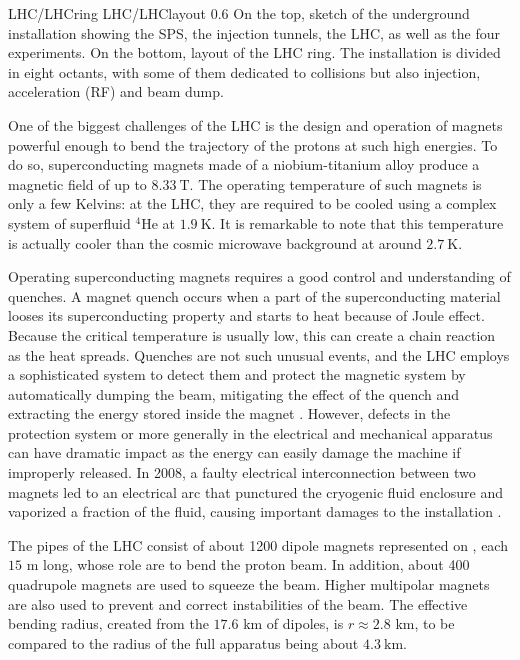                      {LHC/LHCring}
                     {LHC/LHClayout}
                     {0.6}
                     {On the top, sketch of the underground installation showing the SPS,
                     the injection tunnels, the LHC, as well as the four experiments. On
                     the bottom, layout of the LHC ring. The installation is divided in
                     eight octants, with some of them dedicated to collisions but also
                     injection, acceleration (RF) and beam dump.}

    One of the biggest challenges of the LHC is the design and operation of magnets
    powerful enough to bend the trajectory of the protons at such high energies. To do
    so, superconducting magnets made of a niobium-titanium alloy
    produce a magnetic field of up to $8.33~\text{T}$. The operating temperature of such magnets
    is only a few Kelvins: at the LHC, they are required to be cooled using
    a complex system of superfluid $^4$He at $1.9~\text{K}$. It is remarkable to note that this
    temperature is actually cooler than the cosmic microwave background at around $2.7~\text{K}$.

    Operating superconducting magnets requires a good control and understanding of quenches.
    A magnet quench occurs when a part of the superconducting material looses its superconducting
    property and starts to heat because of Joule effect. Because the critical temperature
    is usually low, this can create a chain reaction as the heat spreads. Quenches are
    not such unusual events, and the LHC employs a sophisticated system to detect them and protect
    the magnetic system by automatically dumping the beam, mitigating the effect of the
    quench and extracting the energy stored inside the magnet \cite{LHCmagnets}.
    However, defects in the protection
    system or more generally in the electrical and mechanical apparatus can have dramatic
    impact as the energy can easily damage the machine if improperly released. In 2008,
    a faulty electrical interconnection between two magnets led to an electrical arc that
    punctured the cryogenic fluid enclosure and vaporized a fraction of the fluid, causing
    important damages to the installation \cite{LHCindicent}.

    The pipes of the LHC consist of about 1200 dipole magnets represented on
    , each $15$ m long, whose role are to bend the proton beam.
    In addition, about 400 quadrupole magnets are used to squeeze the
    beam. Higher multipolar magnets are also used to prevent and correct instabilities of
    the beam. The effective bending radius, created from the $17.6$ km of dipoles, is
    $r \approx 2.8$ km, to be compared to the radius of the full apparatus being about $4.3~\text{km}$.

